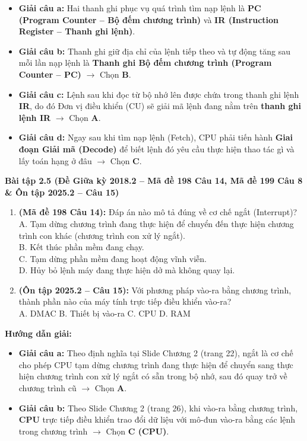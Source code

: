 \begin{itemize}
    \item \textbf{Giải câu a:} Hai thanh ghi phục vụ quá trình tìm nạp lệnh là \textbf{PC (Program Counter -- Bộ đếm chương trình)} và \textbf{IR (Instruction Register -- Thanh ghi lệnh)}.
    \item \textbf{Giải câu b:} Thanh ghi giữ địa chỉ của lệnh tiếp theo và tự động tăng sau mỗi lần nạp lệnh là \textbf{Thanh ghi Bộ đếm chương trình (Program Counter -- PC)} $\rightarrow$ Chọn \textbf{B}.
    \item \textbf{Giải câu c:} Lệnh sau khi đọc từ bộ nhớ lên được chứa trong thanh ghi lệnh \textbf{IR}, do đó Đơn vị điều khiển (CU) sẽ giải mã lệnh đang nằm trên \textbf{thanh ghi lệnh IR} $\rightarrow$ Chọn \textbf{A}.
    \item \textbf{Giải câu d:} Ngay sau khi tìm nạp lệnh (Fetch), CPU phải tiến hành \textbf{Giai đoạn Giải mã (Decode)} để biết lệnh đó yêu cầu thực hiện thao tác gì và lấy toán hạng ở đâu $\rightarrow$ Chọn \textbf{C}.
\end{itemize}

\textbf{Bài tập 2.5 (Đề Giữa kỳ 2018.2 -- Mã đề 198 Câu 14, Mã đề 199 Câu 8 \& Ôn tập 2025.2 -- Câu 15)}
\begin{enumerate}[label=\alph*)]
    \item \textbf{(Mã đề 198 Câu 14):} Đáp án nào mô tả đúng về cơ chế ngắt (Interrupt)?\\
    A. Tạm dừng chương trình đang thực hiện để chuyển đến thực hiện chương trình con khác (chương trình con xử lý ngắt).\\
    B. Kết thúc phần mềm đang chạy.\\
    C. Tạm dừng phần mềm đang hoạt động vĩnh viễn.\\
    D. Hủy bỏ lệnh máy đang thực hiện dở mà không quay lại.
    \item \textbf{(Ôn tập 2025.2 -- Câu 15):} Với phương pháp vào-ra bằng chương trình, thành phần nào của máy tính trực tiếp điều khiển vào-ra?\\
    A. DMAC \quad B. Thiết bị vào-ra \quad C. CPU \quad D. RAM
\end{enumerate}
\textbf{Hướng dẫn giải:}
\begin{itemize}
    \item \textbf{Giải câu a:} Theo định nghĩa tại Slide Chương 2 (trang 22), ngắt là cơ chế cho phép CPU tạm dừng chương trình đang thực hiện để chuyển sang thực hiện chương trình con xử lý ngắt có sẵn trong bộ nhớ, sau đó quay trở về chương trình cũ $\rightarrow$ Chọn \textbf{A}.
    \item \textbf{Giải câu b:} Theo Slide Chương 2 (trang 26), khi vào-ra bằng chương trình, \textbf{CPU} trực tiếp điều khiển trao đổi dữ liệu với mô-đun vào-ra bằng các lệnh trong chương trình $\rightarrow$ Chọn \textbf{C (CPU)}.
\end{itemize}

